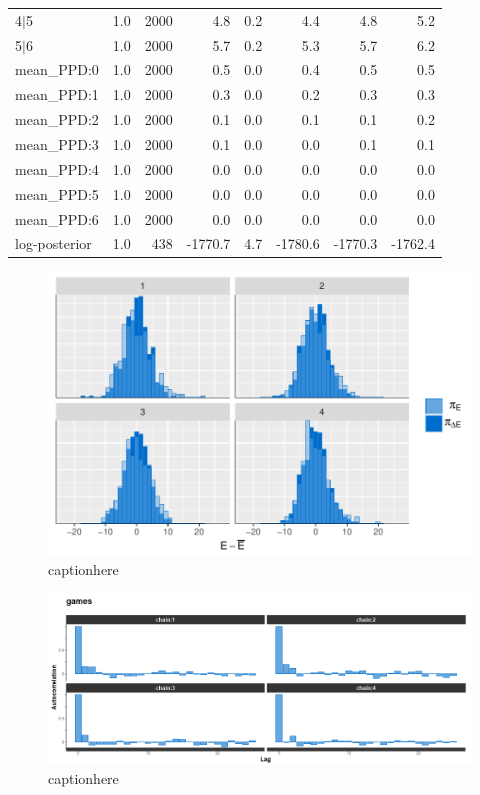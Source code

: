 \documentclass[10pt,a4paper, hidelinks]{article} %
\begin{document}
\begin{table}[ht]
\begin{tabular}{lrrrrrrr}
		4$|$5 & 1.0 & 2000 & 4.8 & 0.2 & 4.4 & 4.8 & 5.2 \\ 
		5$|$6 & 1.0 & 2000 & 5.7 & 0.2 & 5.3 & 5.7 & 6.2 \\ 
		mean\_PPD:0 & 1.0 & 2000 & 0.5 & 0.0 & 0.4 & 0.5 & 0.5 \\ 
		mean\_PPD:1 & 1.0 & 2000 & 0.3 & 0.0 & 0.2 & 0.3 & 0.3 \\ 
		mean\_PPD:2 & 1.0 & 2000 & 0.1 & 0.0 & 0.1 & 0.1 & 0.2 \\ 
		mean\_PPD:3 & 1.0 & 2000 & 0.1 & 0.0 & 0.0 & 0.1 & 0.1 \\ 
		mean\_PPD:4 & 1.0 & 2000 & 0.0 & 0.0 & 0.0 & 0.0 & 0.0 \\ 
		mean\_PPD:5 & 1.0 & 2000 & 0.0 & 0.0 & 0.0 & 0.0 & 0.0 \\ 
		mean\_PPD:6 & 1.0 & 2000 & 0.0 & 0.0 & 0.0 & 0.0 & 0.0 \\ 
		log-posterior & 1.0 & 438 & -1770.7 & 4.7 & -1780.6 & -1770.3 & -1762.4 \\ 
		\bottomrule
	\end{tabular}
\end{table}


\begin{figure}
	\centering
	\includegraphics[width=1\linewidth]{../fig/polr_chain_convergence}
	\caption{captionhere}
	\label{fig:polrchainconvergence}
\end{figure}

\begin{figure}
	\centering
	\includegraphics[width=1\linewidth]{../fig/polr_autocorrelation}
	\caption{captionhere}
	\label{fig:polr_autocorrelation}
\end{figure}
\end{document}
